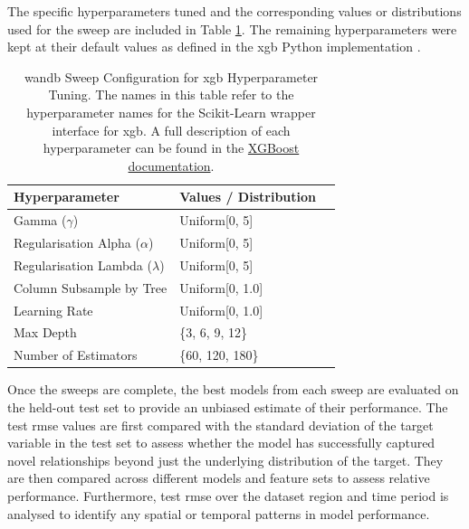 The specific hyperparameters tuned and the corresponding values or distributions used for the sweep are included in Table \ref{tab:wandb-sweep-config}. The remaining hyperparameters were kept at their default values as defined in the \acrshort{xgb} Python implementation .

\begin{table}[!ht]
    \centering
    \caption{\acrshort{wandb} Sweep Configuration for \acrshort{xgb} Hyperparameter Tuning. The names in this table refer to the hyperparameter names for the Scikit-Learn wrapper interface for \acrshort{xgb}. A full description of each hyperparameter can be found in the \href{https://xgboost.readthedocs.io/en/stable/python/python_api.html\#module-xgboost.sklearn}{XGBoost documentation}.}
    \label{tab:wandb-sweep-config}
    \begin{tabular}{llr}     
        \toprule
        \textbf{Hyperparameter} & \textbf{Values / Distribution} \\ 
        \midrule
        Gamma ($\gamma$) & Uniform[0, 5] \\
        Regularisation Alpha ($\alpha$) & Uniform[0, 5] \\
        Regularisation Lambda ($\lambda$) & Uniform[0, 5] \\
        Column Subsample by Tree & Uniform[0, 1.0] \\
        Learning Rate & Uniform[0, 1.0] \\
        Max Depth & \{3, 6, 9, 12\} \\
        Number of Estimators & \{60, 120, 180\} \\
        \bottomrule
    \end{tabular}
\end{table}

Once the sweeps are complete, the best models from each sweep are evaluated on the held-out test set to provide an unbiased estimate of their performance. The test \acrshort{rmse} values are first compared with the standard deviation of the target variable in the test set to assess whether the model has successfully captured novel relationships beyond just the underlying distribution of the target. They are then compared across different models and feature sets to assess relative performance. Furthermore, test \acrshort{rmse} over the dataset region and time period is analysed to identify any spatial or temporal patterns in model performance. 

